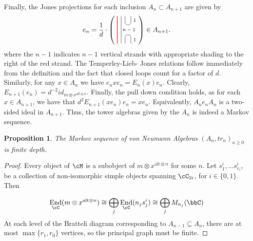 \documentclass[11pt]{article}
\theoremstyle{plain}
\newtheorem{prop}[thm]{Proposition}
\theoremstyle{definition}
\DeclareMathOperator{\End}{End}
\newcommand{\xalt}{x^{\text{alt}\otimes n}}
\begin{document}
Finally, the Jones projections for each inclusion $A_{n}\subset A_{n+1}$ are given by
\begin{equation}\label{eq:JonesProjections}
e_n=
\frac1d\cdot
\left(\,\,
\begin{tikzpicture}[baseline=-.1cm]
	\draw[thick, red] (-.3,-.7) -- (-.3,.7);
	\draw (-.1,-.7) -- (-.1,.7);
	\draw (.1,-.7) -- (.1,-.4) arc (180:0:.15cm) -- (.4,-.7);
	\draw (.1,.7) -- (.1,.4) arc (-180:0:.15cm) -- (.4,.7);
	\node at (.3,0) {\scriptsize{$n-1$}};
	\node at (.6,.5) {\scriptsize{$1$}};
	\node at (.6,-.5) {\scriptsize{$1$}};
\end{tikzpicture}
\right)
\in
A_{n+1}.
\end{equation}
where the $n-1$ indicates $n-1$ vertical strands with appropriate shading to the right of the red strand. The Temperley-Lieb- %
Jones relations follow immediately from the definition and the fact that closed loops count for a factor of $d$. Similarly, 
for any $x\in A_n$ we have $e_nxe_n=E_n(x)e_n$. Clearly, $E_{n+1}(e_n)=d^{-2}id_{m \otimes \xalt}$. Finally, the pull 
down condition %
holds, as for each $x\in A_{n+1}$, we have that $d^2 E_{n+1}(xe_n)e_n=xe_n$. Equivalently, $A_{n} e_n A_n$ is a 
two-sided ideal in $A_{n+1}$. Thus, the tower algebras given by the $A_n$ is indeed a Markov sequence.
 
\begin{prop}
The Markov sequence of von Neumann Algebras $(A_n, tr_n)_{n\geq 0}$ is finite depth.
\end{prop}

\begin{proof}
	Every object of $\cM$ is a subobject of $m\otimes \xalt$ for some $n$. Let $s^i_1,\ldots s^i_{r_i}$, be a collection of non-isomorphic simple objects spanning $\cC_{2i}$, for $i\in\{0,1\}$. Then 

	\[\End_{\cC}(m\otimes\xalt)\cong \bigoplus\limits_{j}\End_{\cC}(n_j s^i_j) \cong \bigoplus\limits_{j}M_{n_j}(\bbC)\]
	At each level of the Bratteli diagram corresponding to $A_{n-1}\subseteq A_n$, 
	there are at most $\max\{r_1,r_0\}$ vertices, so the principal graph must be finite. 
\end{proof}
\end{document}
